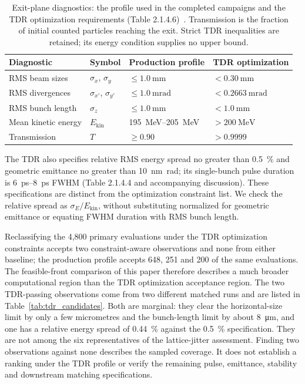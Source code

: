 \documentclass[aps,prab,reprint,superscriptaddress,amsmath,amssymb,floatfix]{revtex4-2}
\begin{document}
\begin{table}[htbp]
\centering
\caption{Exit-plane diagnostics: the profile used in the completed campaigns and the TDR
optimization requirements (Table 2.1.4.6)~\cite{KLSTDR2025}. Transmission is the fraction of
initial counted particles reaching the exit. Strict TDR inequalities are retained; its energy
condition supplies no upper bound.}
\label{tab:constraints}
\begin{tabular}{llll}
\toprule
Diagnostic & Symbol & Production profile & TDR optimization \\
\midrule
RMS beam sizes & $\sigma_x$, $\sigma_y$ & $\le \SI{1.0}{\milli\metre}$ & $<\SI{0.30}{\milli\metre}$ \\
RMS divergences & $\sigma_{x'}$, $\sigma_{y'}$ & $\le \SI{1.0}{\milli\radian}$ &
$<\SI{0.2663}{\milli\radian}$ \\
RMS bunch length & $\sigma_z$ & $\le \SI{1.0}{\milli\metre}$ & $<\SI{1.0}{\milli\metre}$ \\
Mean kinetic energy & $E_\mathrm{kin}$ & \SIrange{195}{205}{\mega\electronvolt} &
$>\SI{200}{\mega\electronvolt}$ \\
Transmission & $T$ & $\ge 0.90$ & $>0.9999$ \\
\bottomrule
\end{tabular}
\end{table}

The TDR also specifies relative RMS energy spread no greater than \SI{0.5}{\percent}
and geometric emittance no greater than \SI{10}{\nano\metre\radian}; its single-bunch pulse
duration is \SIrange{6}{8}{\pico\second} FWHM (Table 2.1.4.4 and accompanying discussion).
These specifications are distinct from the optimization constraint list. We check the relative
spread as $\sigma_E/E_\mathrm{kin}$, without substituting normalized for geometric emittance
or equating FWHM duration with RMS bunch length.

Reclassifying the 4,800 primary evaluations under the TDR optimization constraints accepts two
constraint-aware observations and none from either baseline; the production profile accepts 648,
251 and 200 of the same evaluations. The feasible-front comparison of this paper therefore
describes a much broader computational region than the TDR optimization acceptance region. The
two TDR-passing observations come from two different matched runs and are listed in
Table~\ref{tab:tdr_candidates}. Both are marginal: they clear the horizontal-size limit by only
a few micrometres and the bunch-length limit by about \SI{8}{\micro\metre}, and one has a
relative energy spread of \SI{0.44}{\percent} against the \SI{0.5}{\percent} specification. They
are not among the six representatives of the lattice-jitter assessment. Finding two observations
against none describes the sampled coverage. It does not establish a ranking under the TDR
profile or verify the remaining pulse, emittance, stability and downstream matching
specifications.
\end{document}
